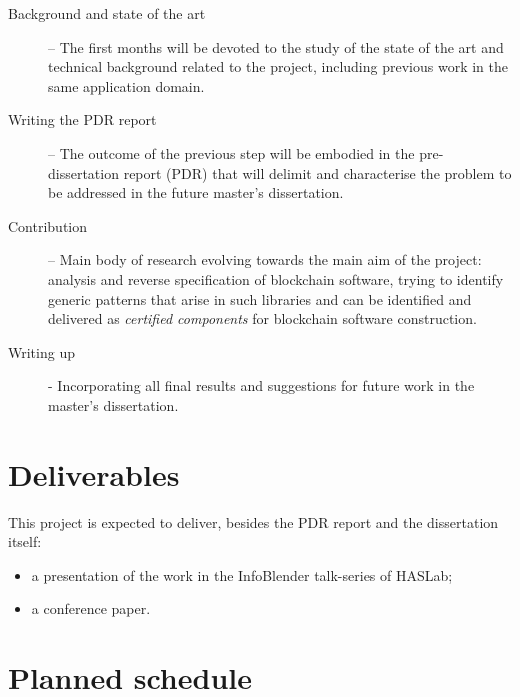 \documentclass[a4paper, 11pt]{article} %
\begin{document}
\begin{description}

\item[Background and state of the art] -- The first months will be devoted
to the study of the state of the art and technical background related to
the project, including previous work in the same application domain.

\item[Writing the PDR report] -- The outcome of the previous step will be
embodied in the pre-dissertation report (PDR) that will delimit and characterise
the problem to be addressed in the future master’s dissertation.

\item[Contribution] -- Main body of research evolving towards the main aim
of the project: analysis and reverse specification of blockchain software,
trying to identify generic patterns that arise in such libraries and can be
identified and delivered as \emph{certified components} for blockchain software construction.

\item[Writing up] - Incorporating all final results and suggestions for future
work in the master's dissertation.
\end{description}


\section*{Deliverables}

This project is expected to deliver, besides the PDR report and the dissertation itself:
\begin{itemize}
\item   a presentation of the work in the InfoBlender talk-series of HASLab;
\item   a conference paper.
\end{itemize}

\section*{Planned schedule}
\end{document}
